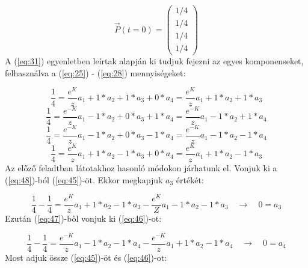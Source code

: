\begin{equation} \label{eq:44}
    \vec{P} \left( t = 0 \right)
    =
    \begin{pmatrix}
        1/4 \\
        1/4 \\
        1/4 \\
        1/4
    \end{pmatrix}
\end{equation}
A (\ref{eq:31}) egyenletben leírtak alapján ki tudjuk fejezni az egyes komponenseket, felhasználva a (\ref{eq:25}) - (\ref{eq:28}) mennyiségeket:

\begin{equation} \label{eq:45}
    \frac{1}{4}
    =
    \frac{e^{K}}{z} a_{1} + 1 * a_{2} + 1 * a_{3} + 0 * a_{4}
    =
    \frac{e^{K}}{z} a_{1} + 1 * a_{2} + 1 * a_{3}
\end{equation}
\begin{equation} \label{eq:46}
    \frac{1}{4}
    =
    \frac{e^{-K}}{z} a_{1} - 1 * a_{2} + 0 * a_{3} + 1 * a_{4}
    =
    \frac{e^{-K}}{z} a_{1} - 1 * a_{2} + 1 * a_{4}
\end{equation}
\begin{equation} \label{eq:47}
    \frac{1}{4}
    =
    \frac{e^{-K}}{z} a_{1} - 1 * a_{2} + 0 * a_{3} - 1 * a_{4}
    =
    \frac{e^{-K}}{z} a_{1} - 1 * a_{2} - 1 * a_{4}
\end{equation}
\begin{equation} \label{eq:48}
    \frac{1}{4}
    =
    \frac{e^{K}}{z} a_{1} + 1 * a_{2} - 1 * a_{3} + 0 * a_{4}
    =
    \frac{e^{K}}{z} a_{1} + 1 * a_{2} - 1 * a_{3}
\end{equation}
Az előző feladtban látotakhoz hasonló módokon járhatunk el. Vonjuk ki a (\ref{eq:48})-ból (\ref{eq:45})-öt. Ekkor megkapjuk $a_{3}$ értékét:

\begin{equation} \label{eq:49}
    \frac{1}{4} - \frac{1}{4}
    =
    \frac{e^{K}}{z} a_{1} + 1 * a_{2} - 1 * a_{3} - \frac{e^{K}}{Z} a_{1} - 1 * a_{2} - 1 * a_{3}
    \quad \to \quad
    \boxed{0 = a_{3}}
\end{equation}
Ezután (\ref{eq:47})-ből vonjuk ki (\ref{eq:46})-ot:

\begin{equation}  \label{eq:50}
    \frac{1}{4} - \frac{1}{4}
    =
    \frac{e^{-K}}{z} a_{1} - 1 * a_{2} - 1 * a_{4} - \frac{e^{-K}}{z} a_{1} + 1 * a_{2} - 1 * a_{4}
    \quad \to \quad
    \boxed{0 = a_{4}}
\end{equation}
Most adjuk össze (\ref{eq:45})-öt és (\ref{eq:46})-ot:

